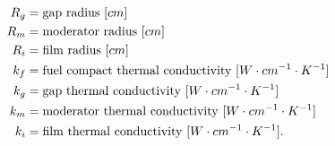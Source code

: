 \begin{align}
    R_g &= \mbox{gap radius } [cm] \notag \\
    R_m &= \mbox{moderator radius } [cm] \notag \\
    R_i &= \mbox{film radius } [cm] \notag \\
    k_f &= \mbox{fuel compact thermal conductivity } [W \cdot cm^{-1} \cdot K^{-1}] \notag \\
    k_g &= \mbox{gap thermal conductivity } [W \cdot cm^{-1} \cdot K^{-1}] \notag \\
    k_m &= \mbox{moderator thermal conductivity } [W \cdot cm^{-1} \cdot K^{-1}] \notag \\
    k_i &= \mbox{film thermal conductivity } [W \cdot cm^{-1} \cdot K^{-1}]. \notag
\end{align}
